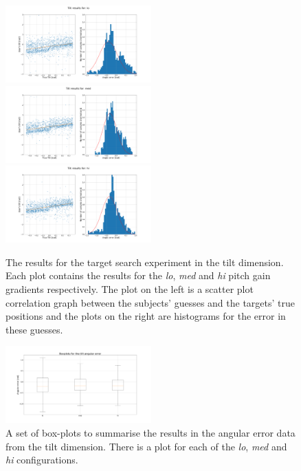 \documentclass[format=sigconf, review=true, screen=true, anonymous=true]{acmart}
\begin{document}
\begin{figure}
  \centering
  \includegraphics[width=0.5\textwidth]{figures/tilt_err_lo.png}
  \includegraphics[width=0.5\textwidth]{figures/tilt_err_med.png}
  \includegraphics[width=0.5\textwidth]{figures/tilt_err_hi.png}
  \caption{The results for the target search experiment in the tilt dimension. Each plot contains the results for the \emph{lo}, \emph{med} and \emph{hi} pitch gain gradients respectively. The plot on the left is a scatter plot correlation graph between the subjects' guesses and the targets' true positions and the plots on the right are histograms for the error in these guesses. }
  \label{fig:tilt-err}
\end{figure}

\begin{figure}
  \centering
  \includegraphics[width=0.5\textwidth]{figures/tilt_error_boxplot.png}
  \caption{A set of box-plots to summarise the results in the angular error data from the tilt dimension. There is a plot for each of the \emph{lo}, \emph{med} and \emph{hi} configurations. }
  \label{fig:tilt-boxplots}
\end{figure}
\end{document}
